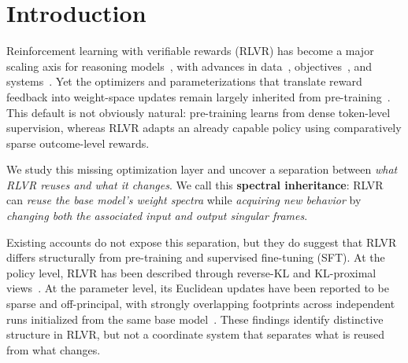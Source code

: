 \documentclass[11pt, a4paper]{utda}
\theoremstyle{plain}
\theoremstyle{definition}
\theoremstyle{remark}
\begin{document}
\section{Introduction}
\label{sec:intro}

Reinforcement learning with verifiable rewards (RLVR) has become a major
scaling axis for reasoning models~\cite{grok2025}, with advances in data~\cite{scale2026rlenvironments},
objectives~\cite{deepseek_r1,tajwar2026maximum},
and systems~\cite{slime_github}.
Yet the optimizers and parameterizations that translate reward feedback into weight-space updates remain largely inherited from pre-training~\cite{adamw,liu2025muon,zhu2025apollo,wen2025fantastic}. This default is not obviously natural: pre-training learns from dense token-level supervision, whereas RLVR adapts an already capable policy using comparatively sparse outcome-level rewards.

\noindent We study this missing optimization layer and uncover a separation between \textit{what RLVR reuses and what it changes}. We call this \textbf{spectral inheritance}: RLVR can \textit{reuse the base model's weight spectra} while \textit{acquiring new behavior} by \textit{changing both the associated input and output singular frames}.

\noindent Existing accounts do not expose this separation, but they do suggest
that RLVR differs structurally from pre-training and supervised fine-tuning
(SFT). At the policy level, RLVR has been described through reverse-KL and
KL-proximal views~\cite{zhu2025path,shenfeld2025rl}. At the parameter level,
its Euclidean updates have been reported to be sparse and off-principal, with
strongly overlapping footprints across independent runs initialized from the
same base model~\cite{mukherjee2025reinforcement,zhu2025path}. These findings
identify distinctive structure in RLVR, but not a coordinate system that
separates what is reused from what changes.
\end{document}
